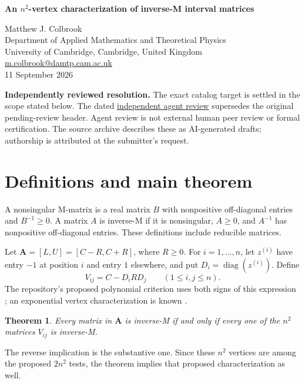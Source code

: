 \documentclass[11pt,a4paper]{article}
\newtheorem{theorem}{Theorem}
\theoremstyle{remark}\newtheorem{remark}[theorem]{Remark}
\newcommand{\diag}{\operatorname{diag}}
\newcommand{\header}[2]{\begin{center}{\Large\bfseries #1\par}\vspace{6pt}{\small #2\par}\end{center}\vspace{6pt}}
\begin{document}
\header{An $n^2$-vertex characterization of inverse-M interval matrices}{Repository IV-03. Claimed resolution; independent review pending.}
\begin{center}Matthew J. Colbrook\\{\small Department of Applied Mathematics and Theoretical Physics\\University of Cambridge, Cambridge, United Kingdom\\\href{mailto:m.colbrook@damtp.cam.ac.uk}{m.colbrook@damtp.cam.ac.uk}}\\11 September 2026\end{center}
\textbf{Independently reviewed resolution.} The exact catalog target is settled in the scope stated below.
The dated \href{https://github.com/MColbrook/OpenProblemsInNLA/blob/codex/colbrook-package-submissions/references/colbrook-intervals-2026-09-11/verification/reviews/IV-03-review.md}{independent agent review} supersedes the original pending-review header. Agent review is not external human peer review or formal certification. The source archive describes these as AI-generated drafts; authorship is attributed at the submitter's request.
\par\medskip
\begin{abstract}
An interval matrix consists entirely of inverse-M matrices if and only if $n^2$ specified vertices are inverse-M matrices. This proves the proposed $2n^2$-vertex criterion and shows that half of those tests are unnecessary. The proof combines induction on principal submatrices, monotonicity of two-index Schur complements, and an adjugate lemma that rules out singularity without assuming regularity in advance. Zero entries, zero interval widths, and reducible matrices are allowed.
\end{abstract}
\section{Definitions and main theorem}
A nonsingular M-matrix is a real matrix $B$ with nonpositive off-diagonal entries and $B^{-1}\ge0$. A matrix $A$ is inverse-M if it is nonsingular, $A\ge0$, and $A^{-1}$ has nonpositive off-diagonal entries. These definitions include reducible matrices.

Let $\boldsymbol A=[L,U]=[C-R,C+R]$, where $R\ge0$. For $i=1,\ldots,n$, let $z^{(i)}$ have entry $-1$ at position $i$ and entry $1$ elsewhere, and put $D_i=\diag(z^{(i)})$. Define
\[
 V_{ij}=C-D_iRD_j\qquad(1\le i,j\le n).
\]
The repository's proposed polynomial criterion uses both signs of this expression \cite{repo,overview}; an exponential vertex characterization is known \cite{intervalproperty}.
\begin{theorem}\label{thm:main}
Every matrix in $\boldsymbol A$ is inverse-M if and only if every one of the $n^2$ matrices $V_{ij}$ is inverse-M.
\end{theorem}
The reverse implication is the substantive one. Since these $n^2$ vertices are among the proposed $2n^2$ tests, the theorem implies that proposed characterization as well.
\end{document}
